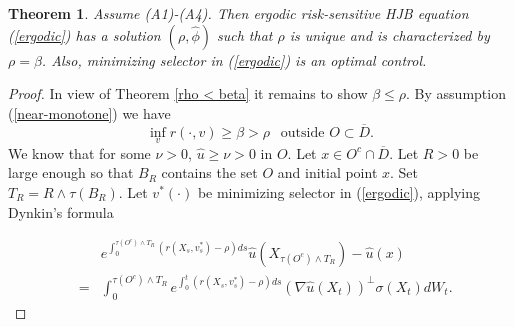 \documentclass[11pt]{amsart}
\newtheorem{theorem}{\bf Theorem}[section]
\numberwithin{equation}{section}
\begin{document}
\begin{theorem}\label{thm_near-monotone}
Assume (A1)-(A4). Then ergodic risk-sensitive HJB equation (\ref{ergodic}) has a solution $(\rho,\hat \phi)$ such 
that $\rho$ is unique and is characterized by $\rho=\beta$. Also, minimizing selector in (\ref{ergodic}) is an optimal control. 
\end{theorem}
\begin{proof} In view of Theorem \ref{rho < beta} it remains to show $\beta \leq \rho$.
By assumption (\ref{near-monotone}) we have 
$$ 
\inf_{v} r(\cdot, v) \geq \beta > \rho \ \ \mbox{ outside } O \subset
\overline{D}. 
$$ 
We know that for some  $\nu>0$, $\hat u\geq \nu>0$ in $O$. Let $x\in O^c \cap \overline{D}$. 
Let $R>0$ be large enough so that $B_R$ contains the set $O$ and initial point $x$. Set $T_R = R \wedge 
\tau(B_R)$.
Let $v^*(\cdot)$ be  minimizing selector in (\ref{ergodic}), applying Dynkin's formula 

\begin{eqnarray*}
&& e^{\int_{0}^{\tau(O^c) \wedge  T_R} (r(X_s,v^*_s)-\rho) ds} \hat u(X_{\tau(O^c) \wedge  T_R})-\hat u(x) \\ & = & 
\int_{0}^{\tau(O^c) \wedge  T_R} e^{\int_{0}^t (r(X_s,v^*_s)-\rho) ds} (\nabla \hat u(X_t))^\bot
\sigma(X_t) dW_t.
\end{eqnarray*}


\end{proof}
\end{document}

